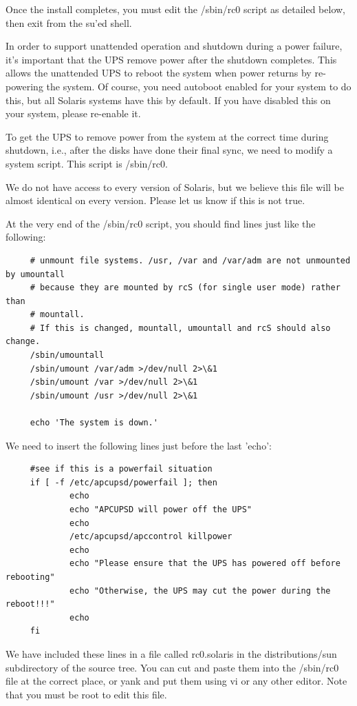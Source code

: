 Once the install completes, you must edit the /sbin/rc0 script as detailed
below, then exit from the su'ed shell.  

In order to support unattended operation and shutdown during a power failure,
it's important that the UPS remove power after the shutdown completes. This
allows the unattended UPS to reboot the system when power returns by
re-powering the system. Of course, you need autoboot enabled for your system
to do this, but all Solaris systems have this by default. If you have disabled
this on your system, please re-enable it.  

To get the UPS to remove power from the system at the correct time during
shutdown, i.e., after the disks have done their final sync, we need to modify
a system script. This script is /sbin/rc0.  

We do not have access to every version of Solaris, but we believe this file
will be almost identical on every version. Please let us know if this is not
true.  

At the very end of the /sbin/rc0 script, you should find lines just like the
following: 

\footnotesize
\begin{verbatim}
     # unmount file systems. /usr, /var and /var/adm are not unmounted by umountall
     # because they are mounted by rcS (for single user mode) rather than
     # mountall.
     # If this is changed, mountall, umountall and rcS should also change.
     /sbin/umountall
     /sbin/umount /var/adm >/dev/null 2>\&1
     /sbin/umount /var >/dev/null 2>\&1
     /sbin/umount /usr >/dev/null 2>\&1
     
     echo 'The system is down.'
\end{verbatim}
\normalsize

We need to insert the following lines just before the last 'echo': 

\footnotesize
\begin{verbatim}
     #see if this is a powerfail situation
     if [ -f /etc/apcupsd/powerfail ]; then
             echo
             echo "APCUPSD will power off the UPS"
             echo
             /etc/apcupsd/apccontrol killpower
             echo
             echo "Please ensure that the UPS has powered off before rebooting"
             echo "Otherwise, the UPS may cut the power during the reboot!!!"
             echo
     fi
\end{verbatim}
\normalsize

We have included these lines in a file called rc0.solaris in the
distributions/sun subdirectory of the source tree. You can cut and paste them
into the /sbin/rc0 file at the correct place, or yank and put them using vi or
any other editor. Note that you must be root to edit this file.  

